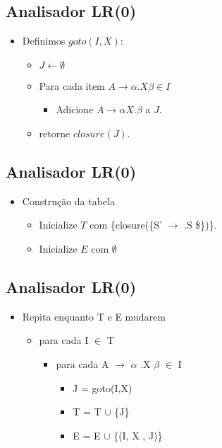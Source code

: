 \documentclass[11pt]{article}
\begin{document}
\subsection*{Analisador LR(0)}
\label{sec:org82b1b54}

\begin{itemize}
\item Definimos \(goto(I,X)\):
\begin{itemize}
\item \(J \leftarrow \emptyset\)
\item Para cada item \(A \to \alpha .X\beta \in I\)
\begin{itemize}
\item Adicione \(A \to \alpha X.\beta\) a \(J\).
\end{itemize}
\item retorne \(closure(J)\).
\end{itemize}
\end{itemize}
\subsection*{Analisador LR(0)}
\label{sec:orgf9ccaf6}

\begin{itemize}
\item Construção da tabela
\begin{itemize}
\item Inicialize \(T\) com \{closure(\{S' \(\to\) .S \$\})\}.
\item Inicialize \(E\) com \(\emptyset\)
\end{itemize}
\end{itemize}
\subsection*{Analisador LR(0)}
\label{sec:org9d02f4e}

\begin{itemize}
\item Repita enquanto T e E mudarem
\begin{itemize}
\item para cada I \(\in\) T
\begin{itemize}
\item para cada A \(\to\) \(\alpha\) .X \(\beta\) \(\in\) I
\begin{itemize}
\item J = goto(I,X)
\item T = T \(\cup\) \{J\}
\item E = E \(\cup\) \{(I, X , J)\}
\end{itemize}
\end{itemize}
\end{itemize}
\end{itemize}
\end{document}
